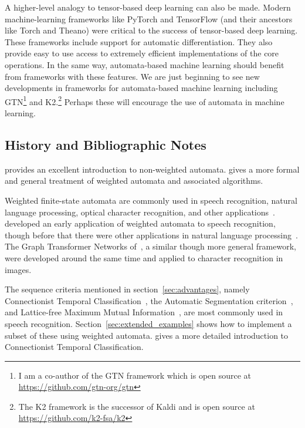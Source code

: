 A higher-level analogy to tensor-based deep learning can also be made. Modern
machine-learning frameworks like PyTorch and TensorFlow (and their ancestors
like Torch and Theano) were critical to the success of tensor-based deep
learning. These frameworks include support for automatic differentiation. They
also provide easy to use access to extremely efficient implementations of the
core operations. In the same way, automata-based machine learning should
benefit from frameworks with these features. We are just beginning to see new
developments in frameworks for automata-based machine learning including
GTN\footnote{I am a co-author of the GTN framework which is open source at
\url{https://github.com/gtn-org/gtn}} and K2.\footnote{The K2 framework is the
successor of Kaldi and is open source at \url{https://github.com/k2-fsa/k2}}
Perhaps these will encourage the use of automata in machine learning.

\subsection{History and Bibliographic Notes}

\citet{hopcroft2001introduction} provides an excellent introduction to
non-weighted automata. \citet{mohri2009weighted} gives a more formal and
general treatment of weighted automata and associated algorithms.

Weighted finite-state automata are commonly used in speech recognition, natural
language processing, optical character recognition, and other
applications~\citep{breuel2008ocropus, knight2009applications, mohri1997finite,
mohri2002weighted, mohri2008speech}. \citet{pereira1997} developed an early
application of weighted automata to speech recognition, though before that
there were other applications in natural language
processing~\citep{pereira1994weighted, sproat1996stochastic}. The Graph
Transformer Networks of~\citet{bottou97}, a similar though more general
framework, were developed around the same time and applied to character
recognition in images.

The sequence criteria mentioned in section~\ref{sec:advantages}, namely
Connectionist Temporal Classification~\citep{graves2006}, the Automatic
Segmentation criterion~\citep{collobert2016wav2letter}, and Lattice-free
Maximum Mutual Information~\citep{povey2016purely}, are most commonly used in
speech recognition. Section~\ref{sec:extended_examples} shows how to implement
a subset of these using weighted automata. \citet{hannun2017sequence} gives a
more detailed introduction to Connectionist Temporal Classification.

